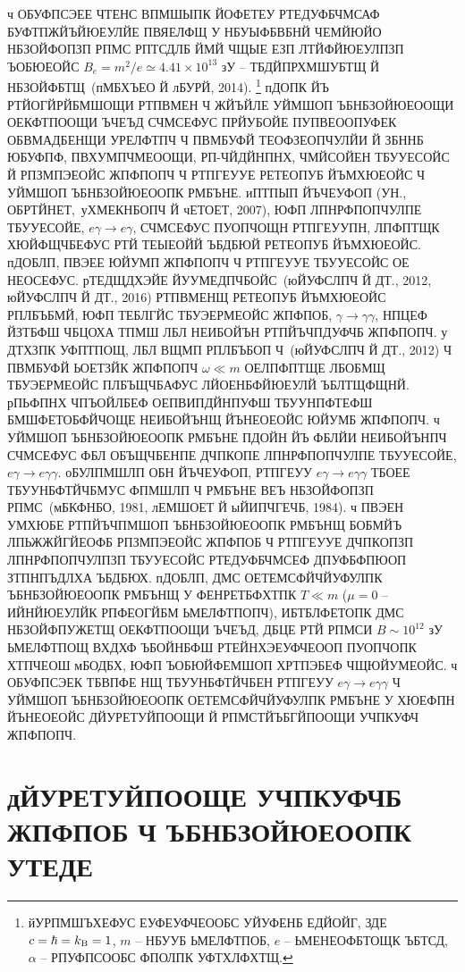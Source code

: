 \documentclass[koi8-r]{pazh2col}
\begin{document}
ч ОБУФПСЭЕЕ ЧТЕНС ВПМШЫПК ЙОФЕТЕУ РТЕДУФБЧМСАФ БУФТПЖЙЪЙЮЕУЛЙЕ ПВЯЕЛФЩ У НБУЫФБВБНЙ ЧЕМЙЮЙО 
НБЗОЙФОПЗП РПМС РПТСДЛБ ЙМЙ ЧЩЫЕ ЕЗП ЛТЙФЙЮЕУЛПЗП ЪОБЮЕОЙС $B_e = m^2/e \simeq 4.41\times10^{13}$ зУ -- 
ТБДЙПРХМШУБТЩ Й НБЗОЙФБТЩ~(пМБХЪЕО Й лБУРЙ, 2014). 
\footnote{йУРПМШЪХЕФУС ЕУФЕУФЧЕООБС УЙУФЕНБ ЕДЙОЙГ, ЗДЕ $c = \hbar = k_{\rm{B}} = 1$, $m$ -- НБУУБ ЬМЕЛФТПОБ,  
$e$ -- ЬМЕНЕОФБТОЩК ЪБТСД, $\alpha$ -- РПУФПСООБС ФПОЛПК УФТХЛФХТЩ.} 
 пДОПК ЙЪ РТЙОГЙРЙБМШОЩИ РТПВМЕН Ч ЖЙЪЙЛЕ УЙМШОП ЪБНБЗОЙЮЕООЩИ ОЕКФТПООЩИ ЪЧЕЪД СЧМСЕФУС ПРЙУБОЙЕ 
ПУПВЕООПУФЕК ОБВМАДБЕНЩИ УРЕЛФТПЧ Ч ПВМБУФЙ ТЕОФЗЕОПЧУЛЙИ Й ЗБННБ ЮБУФПФ, ПВХУМПЧМЕООЩИ, РП-ЧЙДЙНПНХ, 
ЧМЙСОЙЕН ТБУУЕСОЙС Й РПЗМПЭЕОЙС ЖПФПОПЧ Ч РТПГЕУУЕ РЕТЕОПУБ ЙЪМХЮЕОЙС Ч УЙМШОП ЪБНБЗОЙЮЕООПК РМБЪНЕ. 
 иПТПЫП ЙЪЧЕУФОП (УН., ОБРТЙНЕТ,~уХМЕКНБОПЧ Й чЕТОЕТ, 2007), ЮФП ЛПНРФПОПЧУЛПЕ ТБУУЕСОЙЕ, 
$e \gamma \to e \gamma$, СЧМСЕФУС ПУОПЧОЩН РТПГЕУУПН, 
ЛПФПТЩК ХЮЙФЩЧБЕФУС РТЙ ТЕЫЕОЙЙ ЪБДБЮЙ РЕТЕОПУБ ЙЪМХЮЕОЙС. пДОБЛП, ПВЭЕЕ ЮЙУМП ЖПФПОПЧ Ч РТПГЕУУЕ 
ТБУУЕСОЙС ОЕ НЕОСЕФУС. рТЕДЩДХЭЙЕ ЙУУМЕДПЧБОЙС~(юЙУФСЛПЧ Й ДТ., 2012, юЙУФСЛПЧ Й ДТ., 2016) 
РТПВМЕНЩ РЕТЕОПУБ ЙЪМХЮЕОЙС РПЛБЪБМЙ, ЮФП ТЕБЛГЙС 
ТБУЭЕРМЕОЙС ЖПФПОБ, $\gamma \to \gamma \gamma$, НПЦЕФ ЙЗТБФШ ЧБЦОХА ТПМШ ЛБЛ НЕИБОЙЪН РТПЙЪЧПДУФЧБ 
ЖПФПОПЧ. у ДТХЗПК УФПТПОЩ, ЛБЛ ВЩМП РПЛБЪБОП Ч~(юЙУФСЛПЧ Й ДТ., 2012) Ч ПВМБУФЙ ЬОЕТЗЙК ЖПФПОПЧ $\omega \ll m$ 
ОЕЛПФПТЩЕ ЛБОБМЩ ТБУЭЕРМЕОЙС ПЛБЪЩЧБАФУС ЛЙОЕНБФЙЮЕУЛЙ ЪБЛТЩФЩНЙ. рПЬФПНХ ЧПЪОЙЛБЕФ ОЕПВИПДЙНПУФШ 
ТБУУНПФТЕФШ БМШФЕТОБФЙЧОЩЕ НЕИБОЙЪНЩ ЙЪНЕОЕОЙС ЮЙУМБ ЖПФПОПЧ. ч УЙМШОП ЪБНБЗОЙЮЕООПК РМБЪНЕ ПДОЙН 
ЙЪ ФБЛЙИ НЕИБОЙЪНПЧ СЧМСЕФУС ФБЛ ОБЪЩЧБЕНПЕ ДЧПКОПЕ ЛПНРФПОПЧУЛПЕ ТБУУЕСОЙЕ, 
$e \gamma \to e \gamma \gamma$.  
 оБУЛПМШЛП ОБН ЙЪЧЕУФОП, РТПГЕУУ $e \gamma \to e \gamma \gamma$ ТБОЕЕ ТБУУНБФТЙЧБМУС ФПМШЛП 
Ч РМБЪНЕ ВЕЪ НБЗОЙФОПЗП РПМС~(мБКФНБО, 1981, лЕМШОЕТ Й ыЙИПЧГЕЧБ, 1984). ч ПВЭЕН УМХЮБЕ 
РТПЙЪЧПМШОП ЪБНБЗОЙЮЕООПК РМБЪНЩ БОБМЙЪ ЛПЬЖЖЙГЙЕОФБ РПЗМПЭЕОЙС ЖПФПОБ Ч РТПГЕУУЕ 
ДЧПКОПЗП ЛПНРФПОПЧУЛПЗП ТБУУЕСОЙС РТЕДУФБЧМСЕФ ДПУФБФПЮОП ЗТПНПЪДЛХА ЪБДБЮХ. пДОБЛП, ДМС ОЕТЕМСФЙЧЙУФУЛПК 
ЪБНБЗОЙЮЕООПК РМБЪНЩ У ФЕНРЕТБФХТПК $T \ll m$ ($\mu =0$ -- ИЙНЙЮЕУЛЙК РПФЕОГЙБМ ЬМЕЛФТПОПЧ), 
ИБТБЛФЕТОПК ДМС НБЗОЙФПУЖЕТЩ ОЕКФТПООЩИ ЪЧЕЪД, ДБЦЕ РТЙ РПМСИ $B \sim 10^{12}$ зУ ЬМЕЛФТПОЩ ВХДХФ ЪБОЙНБФШ 
РТЕЙНХЭЕУФЧЕООП ПУОПЧОПК ХТПЧЕОШ мБОДБХ, ЮФП ЪОБЮЙФЕМШОП ХРТПЭБЕФ ЧЩЮЙУМЕОЙС. ч ОБУФПСЭЕК ТБВПФЕ 
НЩ ТБУУНБФТЙЧБЕН РТПГЕУУ $e \gamma \to e \gamma \gamma$ Ч УЙМШОП ЪБНБЗОЙЮЕООПК ОЕТЕМСФЙЧЙУФУЛПК 
РМБЪНЕ У ХЮЕФПН ЙЪНЕОЕОЙС ДЙУРЕТУЙПООЩИ Й РПМСТЙЪБГЙПООЩИ УЧПКУФЧ ЖПФПОПЧ.  


\section{дЙУРЕТУЙПООЩЕ УЧПКУФЧБ ЖПФПОБ Ч ЪБНБЗОЙЮЕООПК УТЕДЕ}
\end{document}
